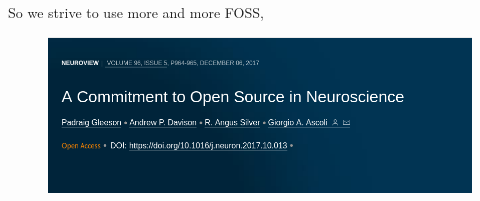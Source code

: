 \begin{frame}[c]{So we strive to use more and more FOSS,}
  \begin{figure}[htpb]
    \centering
    \includegraphics[width=\linewidth]{images/open-source-paper.png}
  \end{figure}
\end{frame}
